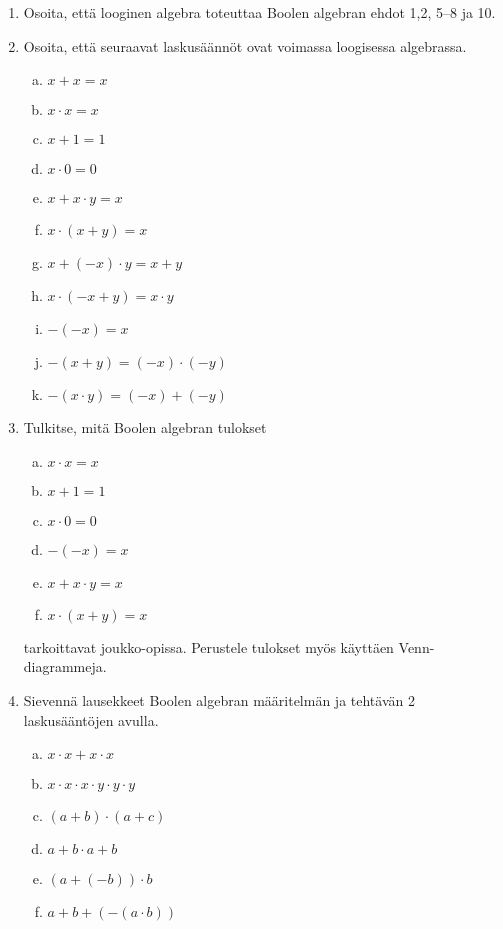 \begin{enumerate}

\item Osoita, että looginen algebra toteuttaa Boolen algebran ehdot 1,2, 5--8 ja 10.

\item Osoita, että seuraavat laskusäännöt ovat voimassa loogisessa algebrassa.
\begin{enumerate}[a)]
\item $x + x = x$
\item $x \cdot x = x$
\item $x + 1 = 1$
\item $x \cdot 0 = 0$
\item $x + x \cdot y = x$
\item $x \cdot (x + y) = x$
\item $x + (-x) \cdot y = x + y$
\item $x \cdot (-x + y) = x \cdot y$
\item $-(-x) = x$
\item $-(x + y) = (-x) \cdot (-y)$
\item $-(x \cdot y) = (-x) + (-y)$
\end{enumerate}

\item
Tulkitse, mitä Boolen algebran tulokset
\begin{enumerate}[a)]
\item $x \cdot x = x$
\item $x + 1 = 1$
\item $x \cdot 0 = 0$
\item $-(-x) = x$
\item $x + x \cdot y = x$
\item $x \cdot (x + y) = x$
\end{enumerate}
tarkoittavat joukko-opissa. Perustele tulokset myös käyttäen Venn-diagrammeja.

\item
Sievennä lausekkeet Boolen algebran määritelmän ja tehtävän 2 laskusääntöjen avulla.
\begin{enumerate}[a)]
\item $x \cdot x + x \cdot x$
\item $x \cdot x \cdot x \cdot y \cdot y \cdot y$
\item $(a + b) \cdot (a + c)$
\item $a + b \cdot a + b$
\item $(a + (-b)) \cdot b$
\item $a + b + (-(a \cdot b))$
\end{enumerate}


\end{enumerate}
